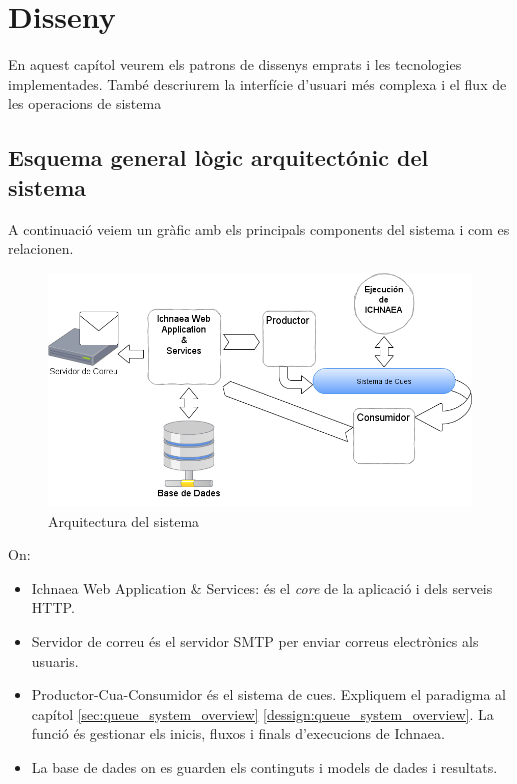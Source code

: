 \chapter{Disseny}
\label{cha:dessign}

En aquest cap\'{i}tol veurem els patrons de dissenys emprats i les tecnologies implementades. Tamb\'{e} descriurem la interf\'{i}cie d'usuari m\'{e}s complexa i el flux de les operacions de sistema


\section{Esquema general l\`{o}gic arquitect\'{o}nic del sistema}
A continuaci\'{o} veiem un gr\`{a}fic amb els principals components del sistema i com es relacionen.

\begin{figure}[h]
  \includegraphics[scale=0.5]{img/design/ArchitectureSoftware.png}
  \caption{Arquitectura del sistema}
  \label{dessign:archsoftware}
\end{figure}
On:
\begin{itemize}
\item Ichnaea Web Application & Services: \'{e}s el \textit{core} de la aplicaci\'{o} i dels serveis HTTP.
\item Servidor de correu \'{e}s el servidor SMTP per enviar correus electr\`{o}nics als usuaris.
\item Productor-Cua-Consumidor \'{e}s el sistema de cues. Expliquem el paradigma al cap\'{i}tol \ref{sec:queue_system_overview} \ref{dessign:queue_system_overview}. La funci\'{o} \'{e}s gestionar els inicis, fluxos i finals d'execucions de Ichnaea.
\item La base de dades on es guarden els continguts i models de dades i resultats.
\end{itemize}

